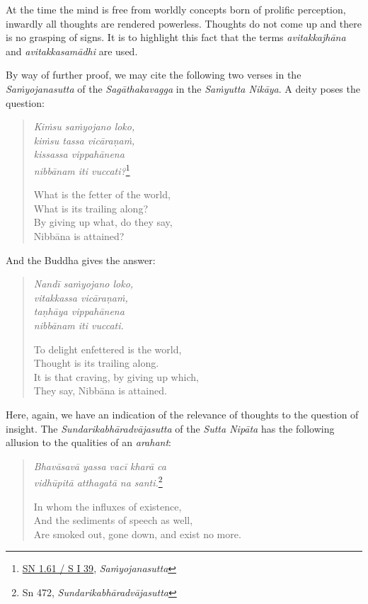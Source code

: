 At the time the mind is free from worldly concepts born of prolific perception, inwardly all thoughts are rendered powerless. Thoughts do not come up and there is no grasping of signs. It is to highlight this fact that the terms \emph{avitakkajhāna} and \emph{avitakkasamādhi} are used.

By way of further proof, we may cite the following two verses in the \emph{Saṁyojanasutta} of the \emph{Sagāthakavagga} in the \emph{Saṁyutta Nikāya}. A deity poses the question:

\begin{quote}
\emph{Kiṁsu saṁyojano loko,}\\
\emph{kiṁsu tassa vicāraṇaṁ,}\\
\emph{kissassa vippahānena}\\
\emph{nibbānam iti vuccati?}\footnote{\href{https://suttacentral.net/sn1.61/pli/ms}{SN 1.61 / S I 39}, \emph{Saṁyojanasutta}}

What is the fetter of the world,\\
What is its trailing along?\\
By giving up what, do they say,\\
Nibbāna is attained?
\end{quote}

And the Buddha gives the answer:

\begin{quote}
\emph{Nandī saṁyojano loko,}\\
\emph{vitakkassa vicāraṇaṁ,}\\
\emph{taṇhāya vippahānena}\\
\emph{nibbānam iti vuccati.}

To delight enfettered is the world,\\
Thought is its trailing along.\\
It is that craving, by giving up which,\\
They say, Nibbāna is attained.
\end{quote}

Here, again, we have an indication of the relevance of thoughts to the question of insight. The \emph{Sundarikabhāradvājasutta} of the \emph{Sutta Nipāta} has the following allusion to the qualities of an \emph{arahant}:

\clearpage

\begin{quote}
\emph{Bhavāsavā yassa vacī kharā ca}\\
\emph{vidhūpitā atthagatā na santi.}\footnote{Sn 472, \emph{Sundarikabhāradvājasutta}}

In whom the influxes of existence,\\
And the sediments of speech as well,\\
Are smoked out, gone down, and exist no more.
\end{quote}

